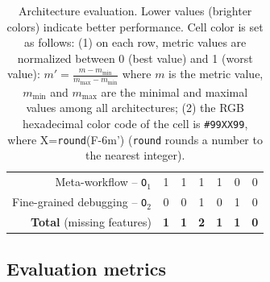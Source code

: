 \documentclass[preprint,3p,twocolumn]{elsarticle}
\newcommand{\note}[2]{\pdfmargincomment[color=yellow,author=#1,open=true]{#2}}
\newcommand{\closednote}[4]{} %
\begin{document}
\begin{table}
\begin{tabular}{rcccccc}
  Meta-workflow  -- \texttt{O$_1$}    & \cellcolor[HTML]{999999}1
                                     & \cellcolor[HTML]{999999}1
                                     & \cellcolor[HTML]{999999}1
                                     & \cellcolor[HTML]{999999}1
                                     & \cellcolor[HTML]{99FF99}0
                                     & \cellcolor[HTML]{99FF99}0\\
  Fine-grained debugging -- \texttt{O$_2$}   & \cellcolor[HTML]{99FF99}0
                                     & \cellcolor[HTML]{99FF99}0
                                     & \cellcolor[HTML]{999999}1
                                     & \cellcolor[HTML]{99FF99}0
                                     & \cellcolor[HTML]{999999}1
                                     & \cellcolor[HTML]{99FF99}0\\
  \textbf{Total} (missing features) & \cellcolor[HTML]{99CC99}\textbf{1}
                                     & \cellcolor[HTML]{99CC99}\textbf{1}
                                     & \cellcolor[HTML]{999999}\textbf{2}
                                     & \cellcolor[HTML]{99CC99}\textbf{1}
                                     & \cellcolor[HTML]{99CC99}\textbf{1}
                                     & \cellcolor[HTML]{99FF99}\textbf{0}\\
\end{tabular}

\caption{Architecture evaluation. Lower values (brighter colors) indicate better performance. Cell color is set as follows: (1) on each row, metric values are
  normalized between 0 (best value) and 1 (worst value):
  $m'=\frac{m-m_{\mathrm{min}}}{m_{\mathrm{max}}-m_{\mathrm{min}}}$ where
  $m$ is the metric value, $m_{\mathrm{min}}$ and $m_{\mathrm{max}}$
  are the minimal and maximal values among all architectures; (2) the RGB hexadecimal color code of the cell
  is \texttt{\#99XX99}, where X=\texttt{round}(F-6m') (\texttt{round} rounds a number to the nearest integer). \closednote{Tristan}{Use 6. Round to the nearest integer.}{Tristan}{Fixed.}}
\label{table:evaluation}
\end{table}

\subsection{Evaluation metrics}
\end{document}
